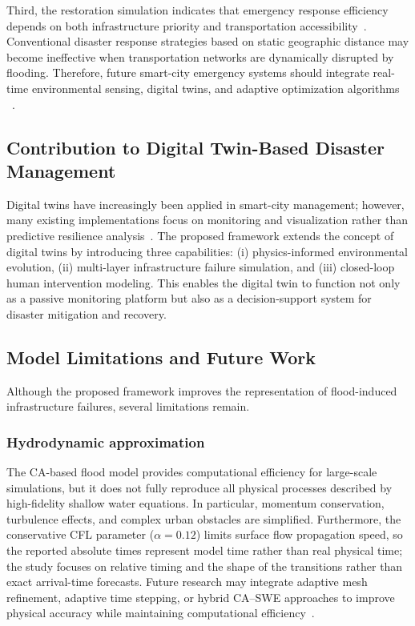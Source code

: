 \documentclass[preprint,12pt]{elsarticle}
\begin{document}
Third, the restoration simulation indicates that emergency response
efficiency depends on both infrastructure priority and transportation
accessibility~\cite{laporte2009fifty}. Conventional disaster response
strategies based on static geographic distance may become ineffective when
transportation networks are dynamically disrupted by flooding. Therefore,
future smart-city emergency systems should integrate real-time environmental
sensing, digital twins, and adaptive optimization algorithms
~\cite{batty2018digital,tao2019digital}.

\subsection{Contribution to Digital Twin-Based Disaster Management}
Digital twins have increasingly been applied in smart-city management;
however, many existing implementations focus on monitoring and visualization
rather than predictive resilience analysis~\cite{grieves2017digital,
batty2018digital}. The proposed framework extends the concept of digital
twins by introducing three capabilities: (i) physics-informed environmental
evolution, (ii) multi-layer infrastructure failure simulation, and (iii)
closed-loop human intervention modeling. This enables the digital twin to
function not only as a passive monitoring platform but also as a
decision-support system for disaster mitigation and recovery.

\subsection{Model Limitations and Future Work}
Although the proposed framework improves the representation of flood-induced
infrastructure failures, several limitations remain.

\subsubsection{Hydrodynamic approximation}
The CA-based flood model provides computational efficiency for large-scale
simulations, but it does not fully reproduce all physical processes described
by high-fidelity shallow water equations. In particular, momentum
conservation, turbulence effects, and complex urban obstacles are simplified.
Furthermore, the conservative CFL parameter ($\alpha = 0.12$) limits surface
flow propagation speed, so the reported absolute times represent model time
rather than real physical time; the study focuses on relative timing and the
shape of the transitions rather than exact arrival-time forecasts. Future
research may integrate adaptive mesh refinement, adaptive time stepping, or
hybrid CA--SWE approaches to improve physical accuracy while maintaining
computational efficiency~\cite{bates2010simple}.
\end{document}
